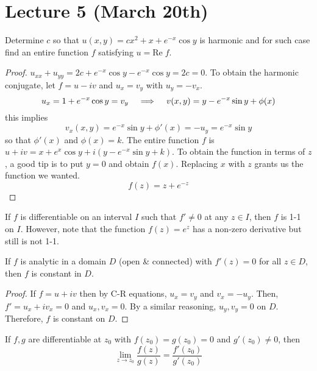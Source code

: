 \section{Lecture 5 (March 20th)}
\begin{ex}
Determine $c$ so that $u(x,y)=cx^2+x+e^{-x}\cos y$ is harmonic and for such case find an entire function $f$ satisfying $u=\mathrm{Re}\;f$. 
\end{ex}
\vspace{2ex}
\begin{proof}
$u_{xx}+u_{yy}=2c+e^{-x}\cos y-e^{-x}\cos y=2c=0$. To obtain the harmonic conjugate, let $f=u-iv$ and $u_{x}=v_{y}$ with $u_{y}=-v_{x}$.
\[u_{x}=1+e^{-x}\cos y=v_{y}\hspace{2ex}\implies\hspace{2ex}v(x,y)=y-e^{-x}\sin y+\phi (x)\]
this implies
\[v_{x}(x,y)=e^{-x}\sin y+\phi '(x)=-u_{y}=e^{-x}\sin y\]
so that $\phi '(x)$ and $\phi (x)=k$. The entire function $f$ is $u+iv=x+e^{x}\cos y+i(y-e^{-x}\sin y+k)$. To obtain the function in terms of $z$, a good tip is to put $y=0$ and obtain $f(x)$. Replacing $x$ with $z$ grants us the function we wanted. 
\[f(z)=z+e^{-z}\]
\end{proof}
\vspace{2ex}
\begin{recall}
If $f$ is differentiable on an interval $I$ such that $f'\ne 0$ at any $z\in I$, then $f$ is 1-1 on $I$. However, note that the function $f(z)=e^{z}$ has a non-zero derivative but still is not 1-1.
\end{recall}
\vspace{2ex}
\begin{thm}
If $f$ is analytic in a domain $D$ (open \& connected) with $f'(z)=0$ for all $z\in D$, then $f$ is constant in $D$. 
\end{thm}
\vspace{2ex}
\begin{proof}
	If $f=u+iv$ then by C-R equations, $u_{x}=v_{y}$ and $v_{x}=-u_{y}$. Then, $f'=u_{x}+iv_{x}=0$ and $u_{x},v_{x}=0$. By a similar reasoning, $u_{y},v_{y}=0$ on $D$. Therefore, $f$ is constant on $D$. 
\end{proof}
\vspace{2ex}
\begin{thm}
If $f,g$ are differentiable at $z_0$ with $f(z_0)=g(z_0)=0$ and $g'(z_0)\ne 0$, then 
\[\lim _{z\rightarrow z_0}\dfrac{f(z)}{g(z)}=\dfrac{f'(z_0)}{g'(z_0)}\]
\end{thm}
\vspace{2ex}
